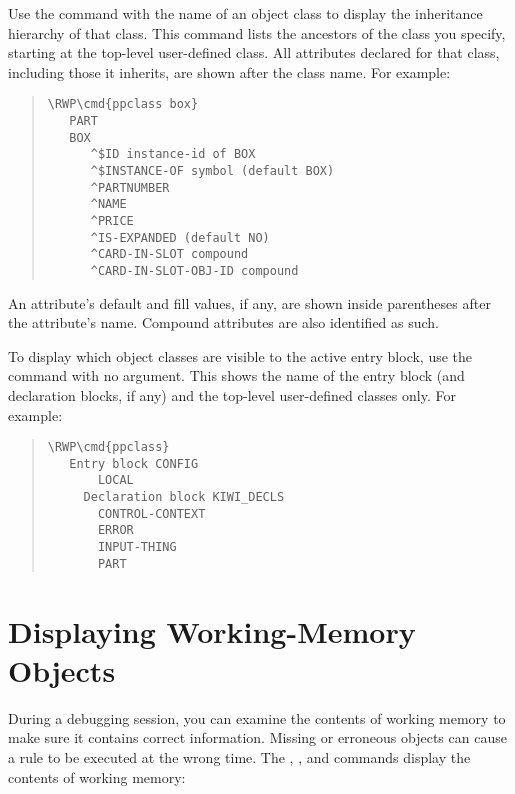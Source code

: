 Use the  command with the name of an object class to
display the inheritance hierarchy of that class. This command lists
the ancestors of the class you specify, starting at the top-level
user-defined class. All attributes declared for that class, including
those it inherits, are shown after the class name. For example:

\begin{quote}
\begin{Verbatim}[commandchars=\\\{\}]
\RWP\cmd{ppclass box}
   PART
   BOX
      ^$ID instance-id of BOX
      ^$INSTANCE-OF symbol (default BOX)
      ^PARTNUMBER
      ^NAME
      ^PRICE
      ^IS-EXPANDED (default NO)
      ^CARD-IN-SLOT compound
      ^CARD-IN-SLOT-OBJ-ID compound
\end{Verbatim}
\end{quote}

An attribute's default and fill values, if any, are shown inside
parentheses after the attribute's name. Compound attributes are also
identified as such.

To display which object classes are visible to the active entry block,
use the  command with no argument. This shows the name of the
entry block (and declaration blocks, if any) and the top-level
user-defined classes only. For example:

\begin{quote}
\begin{Verbatim}[commandchars=\\\{\}]
\RWP\cmd{ppclass}
   Entry block CONFIG
       LOCAL
     Declaration block KIWI_DECLS
       CONTROL-CONTEXT
       ERROR
       INPUT-THING
       PART
\end{Verbatim}
\end{quote}

\section{Displaying Working-Memory Objects}

During a debugging session, you can examine the contents of working
memory to make sure it contains correct information.  Missing or
erroneous objects can cause a rule to be executed at the wrong
time. The , , and  commands display the
contents of working memory:

